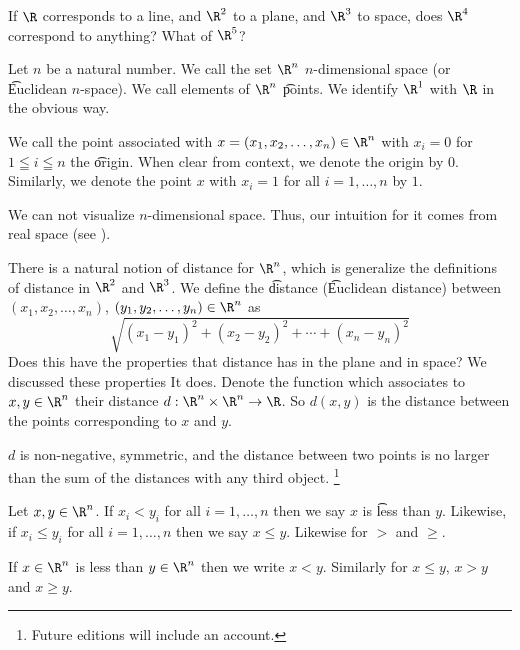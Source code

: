 

If $\R$ corresponds to a line, and $\R^2$ to a plane, and $\R^3$ to space, does $\R^4$ correspond to anything? What of $\R^5$?


Let $n$ be a natural number.
We call the set $\R^n$ \t{$n$-dimensional space} (or \t{Euclidean $n$-space}).
We call elements of $\R^n$ \t{points}.
We identify $\R^1$ with $\R$ in the obvious way.

We call the point associated with $x = (x_1, x_2, \dots, x_n) \in \R^n$ with $x_i = 0$ for $1 \leqq i \leqq n$ the \t{origin}.
When clear from context, we denote the origin by $0$.
Similarly, we denote the point $x$ with $x_i = 1$ for all $i = 1, \dots, n$ by $1$.


We can not visualize $n$-dimensional space.
Thus, our intuition for it comes from real space (see ).


There is a natural notion of distance for $\R^n$, which is generalize the definitions of distance in $\R^2$ and $\R^3$.
We define the \t{distance} (\t{Euclidean distance}) between $(x_1, x_2, \dots, x_n)$, $(y_1, y_2, \dots, y_n) \in \R^n$ as
  \[
\sqrt{(x_1 - y_1)^2 + (x_2 - y_2)^2 + \cdots + (x_n - y_n)^2}
  \]
Does this have the properties that distance has in the plane and in space?
We discussed these properties
It does.
Denote the function which associates to $x, y \in \R^n$ their distance $d: \R^n \times \R^n \to \R$.
So $d(x, y)$ is the distance between the points corresponding to $x$ and $y$.

\begin{proposition}
$d$ is non-negative, symmetric, and the distance between two points is no larger than the sum of the distances with any third object.
  \ifhmode\unskip\fi\footnote{
Future editions will include an account.
  }
\end{proposition}


Let $x, y \in \R^n$.
If $x_i < y_i$ for all $i = 1, \dots, n$ then we say $x$ is \t{less than} $y$.
Likewise, if $x_i \leq y_i$ for all $i = 1, \dots, n$ then we say $x \leq y$.
Likewise for $>$ and $\geq$.

If $x \in \R^n$ is less than $y \in \R^n$ then we write $x < y$.
Similarly for $x \leq y$, $x > y$ and $x \geq y$.
